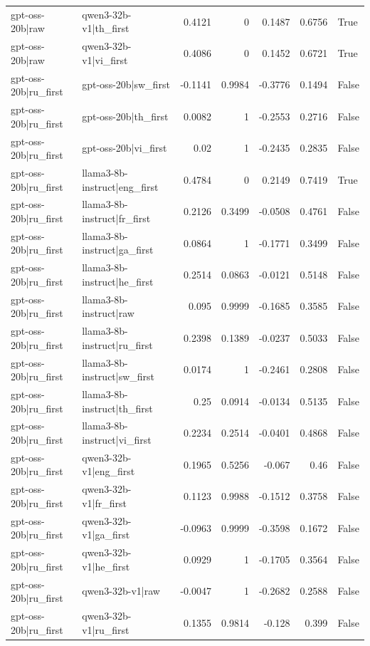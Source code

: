 \begin{table}
\begin{tabular}{l l r r r r l}
gpt-oss-20b|raw & qwen3-32b-v1|th_first & 0.4121 & 0 & 0.1487 & 0.6756 & True \\
gpt-oss-20b|raw & qwen3-32b-v1|vi_first & 0.4086 & 0 & 0.1452 & 0.6721 & True \\
gpt-oss-20b|ru_first & gpt-oss-20b|sw_first & -0.1141 & 0.9984 & -0.3776 & 0.1494 & False \\
gpt-oss-20b|ru_first & gpt-oss-20b|th_first & 0.0082 & 1 & -0.2553 & 0.2716 & False \\
gpt-oss-20b|ru_first & gpt-oss-20b|vi_first & 0.02 & 1 & -0.2435 & 0.2835 & False \\
gpt-oss-20b|ru_first & llama3-8b-instruct|eng_first & 0.4784 & 0 & 0.2149 & 0.7419 & True \\
gpt-oss-20b|ru_first & llama3-8b-instruct|fr_first & 0.2126 & 0.3499 & -0.0508 & 0.4761 & False \\
gpt-oss-20b|ru_first & llama3-8b-instruct|ga_first & 0.0864 & 1 & -0.1771 & 0.3499 & False \\
gpt-oss-20b|ru_first & llama3-8b-instruct|he_first & 0.2514 & 0.0863 & -0.0121 & 0.5148 & False \\
gpt-oss-20b|ru_first & llama3-8b-instruct|raw & 0.095 & 0.9999 & -0.1685 & 0.3585 & False \\
gpt-oss-20b|ru_first & llama3-8b-instruct|ru_first & 0.2398 & 0.1389 & -0.0237 & 0.5033 & False \\
gpt-oss-20b|ru_first & llama3-8b-instruct|sw_first & 0.0174 & 1 & -0.2461 & 0.2808 & False \\
gpt-oss-20b|ru_first & llama3-8b-instruct|th_first & 0.25 & 0.0914 & -0.0134 & 0.5135 & False \\
gpt-oss-20b|ru_first & llama3-8b-instruct|vi_first & 0.2234 & 0.2514 & -0.0401 & 0.4868 & False \\
gpt-oss-20b|ru_first & qwen3-32b-v1|eng_first & 0.1965 & 0.5256 & -0.067 & 0.46 & False \\
gpt-oss-20b|ru_first & qwen3-32b-v1|fr_first & 0.1123 & 0.9988 & -0.1512 & 0.3758 & False \\
gpt-oss-20b|ru_first & qwen3-32b-v1|ga_first & -0.0963 & 0.9999 & -0.3598 & 0.1672 & False \\
gpt-oss-20b|ru_first & qwen3-32b-v1|he_first & 0.0929 & 1 & -0.1705 & 0.3564 & False \\
gpt-oss-20b|ru_first & qwen3-32b-v1|raw & -0.0047 & 1 & -0.2682 & 0.2588 & False \\
gpt-oss-20b|ru_first & qwen3-32b-v1|ru_first & 0.1355 & 0.9814 & -0.128 & 0.399 & False \\

\end{tabular}
\end{table}
